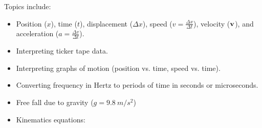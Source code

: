 \begin{questions}

\newpage
{}
\qsp

Topics include:
\begin{itemize}
\item Position ($x$), time ($t$), displacement ($\Delta x$), speed ($v = \frac{\Delta x}{\Delta t}$), velocity ($\vb{v}$), and acceleration ($a = \frac{\Delta v}{\Delta t}$). 
\item Interpreting ticker tape data. 
\item Interpreting graphs of motion (position vs. time, speed vs. time). 
\item Converting frequency in Hertz to periods of time in seconds or microseconds. 
\item Free fall due to gravity ($g=\SI{9.8}{m/s^2}$)
\item Kinematics equations:
\qsp
{}


\end{itemize}
\end{questions}
